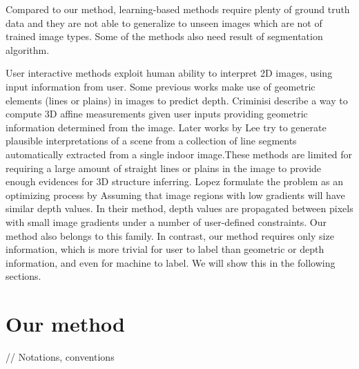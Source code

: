 \documentclass[10pt,twocolumn,letterpaper]{article}
\begin{document}
Compared to our method, learning-based methods require plenty of ground truth data and they are not able to generalize to unseen images which are not of trained image types. Some of the methods \cite{Liu+al:CVPR10, Wang_2015_CVPR} also need result of segmentation algorithm.

User interactive methods exploit human ability to interpret 2D images, using input information from user. Some previous works make use of geometric elements (lines or plains) in images to predict depth. Criminisi \etal \cite{Criminisi2000} describe a way to compute 3D affine measurements given user inputs providing geometric information determined from the image. Later works \cite{Lee2009GeometricRF} by Lee \etal try to generate plausible interpretations of a scene from a collection of line segments automatically extracted from a single indoor image.These methods are limited for requiring a large amount of straight lines or plains in the image to provide enough evidences for 3D structure inferring. Lopez \etal \cite{ceig.20141109} formulate the problem as an optimizing process by Assuming that image regions with low gradients will have similar depth values. In their method, depth values are propagated between pixels with small image gradients under a number of user-defined constraints. Our method also belongs to this family. In contrast, our method requires only size information, which is more trivial for user to label than geometric or depth information, and even for machine to label. We will show this in the following sections.

\section{Our method}
// Notations, conventions
\end{document}
